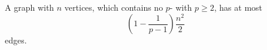 \documentclass[12pt]{article}
\begin{document}
A graph with $n$ vertices, which contains no $p$- with $p\geq 2$, has at most
$$\left(1-\frac{1}{p-1}\right)\frac{n^2}{2}$$
edges.
\end{document}
